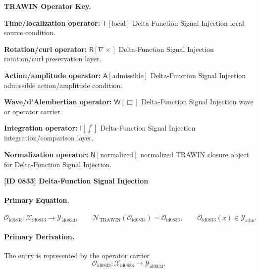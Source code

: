 \par\vspace{0.45\baselineskip}
\noindent\begin{minipage}[t]{\linewidth}
\begingroup
\small
\raggedright
\textbf{TRAWIN Operator Key.}\par
\noindent\textbf{Time/localization operator:} $\mathsf{T}\!\left[\mathrm{local}\right]$ Delta-Function Signal Injection local source condition.\par
\noindent\textbf{Rotation/curl operator:} $\mathsf{R}\!\left[\nabla\times\right]$ Delta-Function Signal Injection rotation/curl preservation layer.\par
\noindent\textbf{Action/amplitude operator:} $\mathsf{A}\!\left[\mathrm{admissible}\right]$ Delta-Function Signal Injection admissible action/amplitude condition.\par
\noindent\textbf{Wave/d'Alembertian operator:} $\mathsf{W}\!\left[\Box\right]$ Delta-Function Signal Injection wave or operator carrier.\par
\noindent\textbf{Integration operator:} $\mathsf{I}\!\left[\int\right]$ Delta-Function Signal Injection integration/comparison layer.\par
\noindent\textbf{Normalization operator:} $\mathsf{N}\!\left[\mathrm{normalized}\right]$ normalized TRAWIN closure object for Delta-Function Signal Injection.\par
\endgroup
\end{minipage}

\clearpage
\noindent\textbf{[ID 0833] Delta-Function Signal Injection}\par
\vspace{0.35em}
\paragraph{Primary Equation.}
\[
\mathcal{O}_{\mathrm{id0833}}:\mathcal{X}_{\mathrm{id0833}}\longrightarrow \mathcal{Y}_{\mathrm{id0833}},\qquad
\mathcal{N}_{\mathrm{TRAWIN}}(\mathcal{O}_{\mathrm{id0833}})=\mathcal{O}_{\mathrm{id0833}},\qquad
\mathcal{O}_{\mathrm{id0833}}(x)\in\mathcal{Y}_{\mathrm{adm}}.
\]

\paragraph{Primary Derivation.} The entry is represented by the operator carrier\[
\mathcal{O}_{\mathrm{id0833}}:\mathcal{X}_{\mathrm{id0833}}\longrightarrow \mathcal{Y}_{\mathrm{id0833}}.
\]

